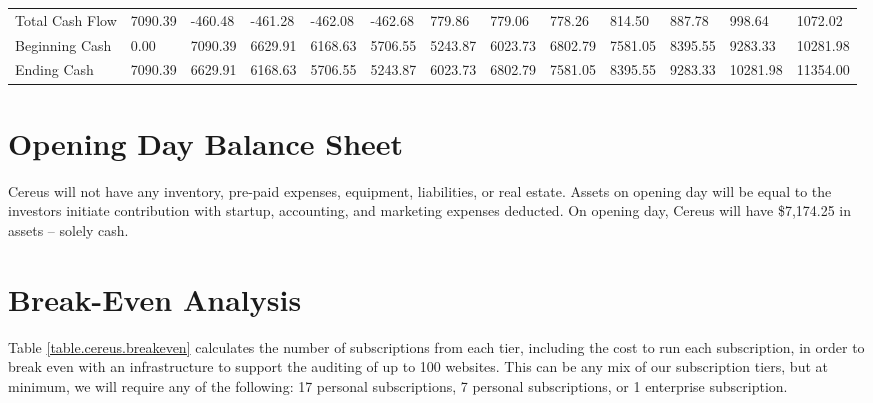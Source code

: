 \begin{sidewaystable}
\begin{table}[H]
\begin{tabularx}{\textwidth}{X X X X X X X X X X X X X}
    \multicolumn{1}{l}{Total Cash Flow} & 7090.39 & -460.48 & -461.28 & -462.08 & -462.68 & 779.86 & 779.06 & 778.26 & 814.50 & 887.78 & 998.64 & 1072.02  \\
    \multicolumn{1}{l}{Beginning Cash} & 0.00 & 7090.39 & 6629.91 & 6168.63 & 5706.55 & 5243.87 & 6023.73 & 6802.79 & 7581.05 & 8395.55 & 9283.33 & 10281.98  \\
    \multicolumn{1}{l}{Ending Cash} & 7090.39 & 6629.91 & 6168.63 & 5706.55 & 5243.87 & 6023.73 & 6802.79 & 7581.05 & 8395.55 & 9283.33 & 10281.98 & 11354.00  \\

  \end{tabularx}
  \label{table.cash.flow}
\end{table}
\end{sidewaystable}

\section{Opening Day Balance Sheet}

Cereus will not have any inventory, pre-paid expenses, equipment, liabilities, or real estate. Assets on opening day will be equal to the investors initiate contribution with startup, accounting, and marketing expenses deducted. On opening day, Cereus will have \$7,174.25 in assets -- solely cash.

\section{Break-Even Analysis}

Table \ref{table.cereus.breakeven} calculates the number of subscriptions from each tier, including the cost to run each subscription, in order to break even with an infrastructure to support the auditing of up to 100 websites. This can be any mix of our subscription tiers, but at minimum, we will require any of the following: 17 personal subscriptions, 7 personal subscriptions, or 1 enterprise subscription.
